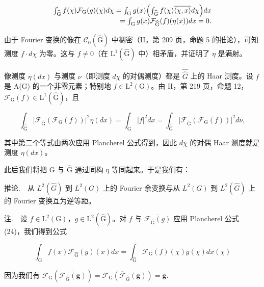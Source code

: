 \[
\begin{array}{r} \int_ {\widehat {\mathrm{G}}} f (\chi) \mathcal {F} _ {\mathrm{G}} (g) (\chi) d \chi = \int_ {\mathrm{G}} g (x) \Bigl (\int_ {\widehat {\mathrm{G}}} f (\chi) \overline {{\langle \chi , x \rangle}} d \chi \Bigr) d x \\ = \int_ {\mathrm{G}} g (x) \mathcal {F} _ {\widehat {\mathrm{G}}} (f) (\eta (x)) d x = 0. \end{array}
\]

由于 Fourier 变换的像在 \(\mathcal{C}_{0}(\widehat{\mathrm{G}})\) 中稠密（II，第 209 页，命题 5 的推论），可知测度 \(f \cdot d\chi\) 为零。这与 \(f \neq 0\)（在 \(\mathrm{L}^{1}(\widehat{\mathrm{G}})\) 中）相矛盾，并证明了 \(\eta\) 是满射。

像测度 \(\eta(dx)\) 与测度 \(\nu\)（即测度 \(d\chi\) 的对偶测度）都是 \(\widehat{\widehat{G}}\) 上的 Haar 测度。设 \(f\) 是 A(G) 的一个非零元素；特别地 \(f \in \mathrm{L}^2(\mathrm{G})\)。由 II，第 219 页，命题 12，\(\mathcal{F}_{\mathrm{G}}(f) \in \mathrm{L}^{1}(\widehat{\mathrm{G}})\)，且

\[
\int_ {\widehat {\widehat {\mathrm{G}}}} \Big | \overline {{\mathcal {F}}} _ {\widehat {\mathrm{G}}} (\mathcal {F} _ {\mathrm{G}} (f)) \Big | ^ {2} \eta (d x) = \int_ {\mathrm{G}} | f | ^ {2} d x = \int_ {\widehat {\widehat {\mathrm{G}}}} \Big | \overline {{\mathcal {F}}} _ {\widehat {\mathrm{G}}} (\mathcal {F} _ {\mathrm{G}} (f)) \Big | ^ {2} d \nu ,
\]

其中第二个等式由两次应用 Plancherel 公式得到，因此 \(d\chi\) 的对偶 Haar 测度就是测度 \(\eta(dx)\)。

此后我们将把 G 与 \(\widehat{\mathrm{G}}\) 通过同构 \(\eta\) 等同起来。于是我们有：

推论.　从 \(L^{2}(\widehat{G})\) 到 \(L^{2}(G)\) 上的 Fourier 余变换与从 \(L^{2}(G)\) 到 \(L^{2}(\widehat{G})\) 上的 Fourier 变换互为逆等距。

注.　设 \(f \in \mathrm{L}^2(\mathrm{G})\)，\(g \in \mathrm{L}^2(\widehat{\mathrm{G}})\)。对 \(f\) 与 \(\overline{\mathcal{F}_{\widehat{\mathrm{G}}}(g)}\) 应用 Plancherel 公式 (24)，我们得到公式

\[
\int_ {\mathrm{G}} f (x) \mathcal {F} _ {\widehat {\mathrm{G}}} (g) (x) d x = \int_ {\widehat {\mathrm{G}}} \mathcal {F} _ {\mathrm{G}} (f) (\chi) g (\chi) d \widehat {x} (\chi)\tag{29}
\]

因为我们有 \(\mathcal{F}_{\mathrm{G}}(\overline{\mathcal{F}_{\widehat{\mathrm{G}}}(\boldsymbol{g})}) = \mathcal{F}_{\mathrm{G}}(\overline{\mathcal{F}}_{\widehat{\mathrm{G}}}(\overline{\boldsymbol{g}})) = \overline{\boldsymbol{g}}.\)

